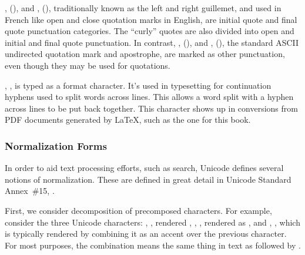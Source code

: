 ,  (\charmention{}), and ,
(\charmention{}), traditionally known as the left and right guillemet,
and used in French like open and close quotation marks in English, are
initial quote and final quote punctuation categories.  The ``curly''
quotes are also divided into open and initial and final quote
punctuation.  In contrast, ,  (), and ,
 (), the standard ASCII
undirected quotation mark and apostrophe, are marked as other
punctuation, even though they may be used for quotations.

, , is typed as a format
character.  It's used in typesetting for continuation hyphens used to
split words across lines.  This allows a word split with a hyphen
across lines to be put back together.  This character shows up in
conversions from PDF documents generated by \LaTeX, such as the one
for this book.







\subsubsection{Normalization Forms}\label{section:unicode-normalization-forms}

In order to aid text processing efforts, such as search, Unicode
defines several notions of normalization.  These are defined in great
detail in Unicode Standard Annex~\#15, .

First, we consider decomposition of precomposed characters.  For
example, consider the three Unicode characters: ,
, rendered
, , , 
rendered as , and ,
, which is typically rendered
by combining it as an accent over the previous character.  For most
purposes, the combination  means the same thing in text
as  followed by .

